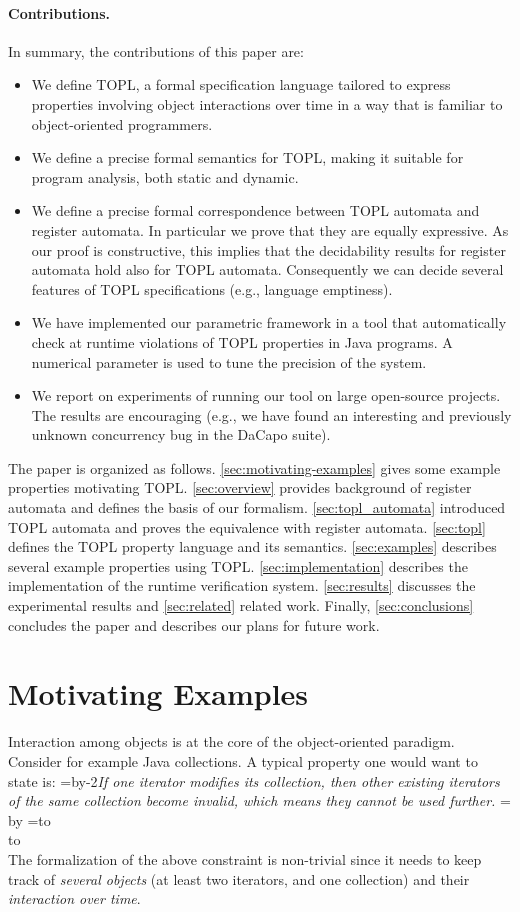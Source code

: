 \documentclass[9pt, preprint]{sigplanconf} %
\newcommand{\quoteindent}{1.5\parindent} %
\newcommand{\eqquote}[2]{{%
  \refstepcounter{equation}\label{#2}%
  \newdimen\qi\qi=\quoteindent
  \setbox0=\vbox{\advance\hsize by-2\qi\noindent\em#1}%
  \newdimen\x\x=\ht0 \advance\x by\dp0%
  \setbox1=\vbox to\x{\vss\hbox{(\arabic{equation})}\vss}%
  \leavevmode\\[1ex]%
  \hbox to\hsize{\hskip\qi\box0\hfil\box1}%
  \\[1ex]}}
\theoremstyle{definition}
\theoremstyle{remark}
\begin{document}
\paragraph{Contributions.}
In summary, the contributions of this paper are:
\begin{itemize}
\item We define TOPL, a formal specification language tailored to express properties involving object interactions over time in a way that is familiar to object-oriented programmers.
\item We define a precise formal semantics for TOPL, making it suitable for program analysis, both static and dynamic.
\item We define a precise formal correspondence between TOPL automata and register automata. 
In particular we prove that they are equally expressive. As our proof is constructive, this implies that the decidability results for register automata hold also for TOPL automata. Consequently we can decide several features of TOPL specifications (e.g., language emptiness).
\item We have implemented our parametric framework  in a tool that automatically check at runtime violations of TOPL properties in Java programs. A numerical parameter is used to tune the precision of the system.

\item We report on experiments of running our tool on large open-source projects. The results are encouraging (e.g., we have found
an interesting and previously unknown  concurrency bug in the DaCapo suite). 
\end{itemize}


The paper is organized as follows.
\autoref{sec:motivating-examples} gives some example properties motivating TOPL.
\autoref{sec:overview} provides background of register automata and defines the basis of our formalism.
\autoref{sec:topl_automata} introduced TOPL automata and proves the equivalence with register automata. 
\autoref{sec:topl} defines the TOPL property language and its semantics.
\autoref{sec:examples} describes several example properties using TOPL.
\autoref{sec:implementation} describes  the implementation of the runtime  verification system.
\autoref{sec:results} discusses the experimental results and \autoref{sec:related}  related work.
Finally, \autoref{sec:conclusions} concludes the paper and describes our plans for future work.

\section{Motivating Examples} %
\label{sec:motivating-examples}
Interaction among objects is at the core of the object-oriented paradigm.
Consider for example  Java collections. A typical property one would want to state  is:
\eqquote{If one iterator modifies its collection, then other existing iterators of the same collection become invalid, which means they cannot be used further.}{q:concur-it}
The formalization of the above constraint is non-trivial since it needs to keep track of {\em several objects} (at least two iterators, and one collection) and their {\em interaction over time}.
\end{document}
